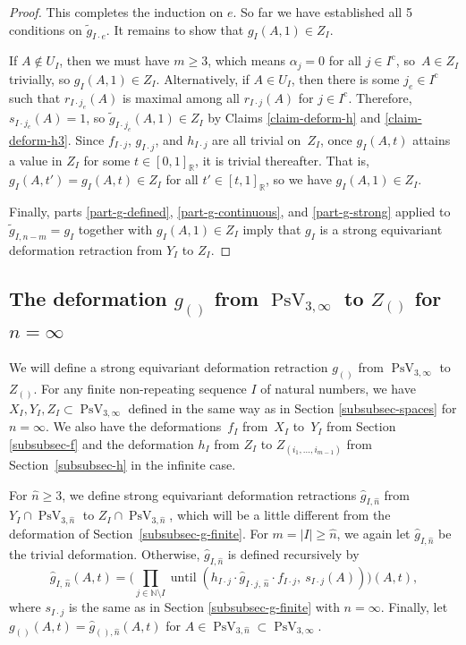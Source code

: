 \documentclass[JEP,XML,SOM,Unicode,NoFloatCountersInSection,published]{cedram}
\theoremstyle{remark}
\let\mb\mathbb
\newcommand{\compl}[1]{{{#1}^{\text{c}}}}
\DeclareMathOperator{\pstief}{PsV}
\DeclareMathOperator{\upto}{until}
\begin{document}
\begin{proof}
This completes the induction on $e$.
So far we have established all 5 conditions on $\tilde g_{I\cdot e}$.
It remains to show that $g_I(A,1) \in Z_I$.

If $A \not\in U_I$, then we must have $m \geq 3$, which means $\alpha_j = 0$ for all $j \in \compl{I}$, so~$A \in Z_I$ trivially, so $g_I(A,1) \in Z_I$.
Alternatively, if $A \in U_I$, then there is some $j_e \in \compl{I}$ such that $r_{I\cdot j_e}(A)$ is maximal among all $r_{I\cdot j}(A)$ for $j \in \compl{I}$.
Therefore, $s_{I\cdot j_e}(A) = 1$, so $\tilde g_{I\cdot j_e}(A,1) \in Z_I$ by Claims \ref{claim-deform-h} and \ref{claim-deform-h3}. Since $f_{I\cdot j}$, $g_{I\cdot j}$, and $h_{I\cdot j}$ are all trivial on~$Z_I$, once $g_I(A,t)$ attains a value in $Z_I$ for some $t \in [0,1]_\mb{R}$, it is trivial thereafter. That is, $g_I(A,t') = g_I(A,t) \in Z_I$ for all $t' \in [t,1]_\mb{R}$, so we have $g_I(A,1) \in Z_I$.

Finally, parts \eqref{part-g-defined}, \eqref{part-g-continuous}, and \eqref{part-g-strong} applied to $\tilde g_{I,n-m} = g_I$ together with $g_I(A,1) \in Z_I$ imply that $g_I$ is a strong equivariant deformation retraction from $Y_I$ to $Z_I$.
\end{proof}

\subsection{The deformation $g_{()}$ from $\pstief_{3,\infty}$ to $Z_{()}$ for $n = \infty$}
\label{subsubsec-g-infinite}

We will define a strong equivariant deformation retraction $g_{()}$ from $\pstief_{3,\infty}$ to $Z_{()}$.
For any finite non-repeating sequence $I$ of natural numbers, we have $X_I,Y_I,Z_I \subset \pstief_{3,\infty}$ defined in the same way as in Section \ref{subsubsec-spaces} for $n = \infty$.
We also have the deformations~$f_I$ from~$X_I$ to~$Y_I$ from Section \ref{subsubsec-f} and the deformation $h_I$ from $Z_{I}$ to $Z_{(i_1,\dots,i_{m-1})}$ from Section~\ref{subsubsec-h} in the infinite case.

For $\hat n \geq 3$, we define strong equivariant deformation retractions $\hat g_{I,\hat n}$ from \hbox{$Y_I \cap \pstief_{3,\hat n}$} to $Z_I \cap \pstief_{3,\hat n}$, which will be a little different from the deformation of Section~\ref{subsubsec-g-finite}.
For $m = |I| \geq \hat n$, we again let $\hat g_{I,\hat n}$ be the trivial deformation. Otherwise, $\hat g_{I,\hat n}$ is defined recursively by
\begin{equation}\label{equation-g-infty}
\hat g_{I,\, \hat n}({A},t) = \biggl( \prod_{j \in \mb{N} \setminus I } \upto\left(h_{I \cdot j} \cdot \hat g_{I \cdot j,\, \hat n} \cdot f_{I \cdot j},\ s_{I \cdot j} ({A}) \right)\biggr) ({A},t),
\end{equation}
where $s_{I\cdot j}$ is the same as in Section \ref{subsubsec-g-finite} with $n = \infty$.
Finally, let $g_{()}(A,t) = \hat g_{(),\hat n}(A,t)$ for $A \in \pstief_{3,\hat n} \subset \pstief_{3,\infty}$.
\end{document}
